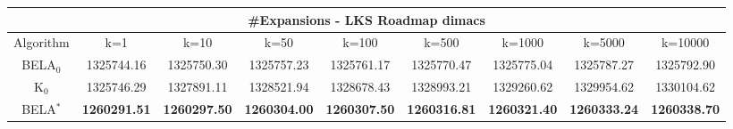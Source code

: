 \begin{tabular}{c|cccccccc}\toprule
\multicolumn{9}{c}{#Expansions - LKS Roadmap dimacs}\\ \midrule
Algorithm & k=1 & k=10 & k=50 & k=100 & k=500 & k=1000 & k=5000 & k=10000 \\ \midrule
BELA$_0$ & 1325744.16 & 1325750.30 & 1325757.23 & 1325761.17 & 1325770.47 & 1325775.04 & 1325787.27 & 1325792.90 \\
K$_0$ & 1325746.29 & 1327891.11 & 1328521.94 & 1328678.43 & 1328993.21 & 1329260.62 & 1329954.62 & 1330104.62 \\
BELA$^*$ & \textbf{1260291.51} & \textbf{1260297.50} & \textbf{1260304.00} & \textbf{1260307.50} & \textbf{1260316.81} & \textbf{1260321.40} & \textbf{1260333.24} & \textbf{1260338.70} \\ \bottomrule 
\end{tabular}
